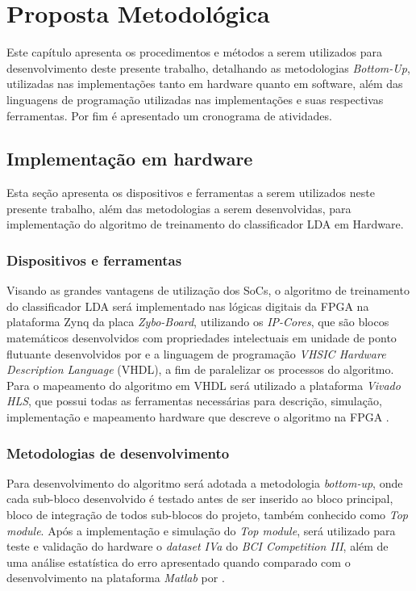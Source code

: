 \chapter[Proposta Metodológica]{Proposta Metodológica}
Este capítulo apresenta os procedimentos e métodos a serem utilizados para desenvolvimento deste presente
 trabalho, detalhando as metodologias \textit{Bottom-Up}, utilizadas nas implementações tanto em hardware
 quanto em software, além das linguagens de programação utilizadas nas implementações e suas respectivas
 ferramentas. Por fim é apresentado um cronograma de atividades.

\section{Implementação em hardware}
Esta seção apresenta os dispositivos e ferramentas a serem utilizados neste presente trabalho, além das metodologias a serem desenvolvidas, para implementação do algoritmo de treinamento do classificador LDA em Hardware.

\subsection{Dispositivos e ferramentas}
Visando as grandes vantagens de utilização dos SoCs, o algoritmo de treinamento do classificador
 LDA será implementado nas lógicas digitais da FPGA na plataforma Zynq da placa \textit{Zybo-Board}, utilizando
 os \textit{IP-Cores}, que são blocos matemáticos desenvolvidos com propriedades intelectuais \cite{munoz2010tradeoff} em unidade de ponto flutuante desenvolvidos por \cite{munoz2010tradeoff} e a linguagem de programação \textit{VHSIC Hardware Description Language} (VHDL), a fim de paralelizar os
 processos do algoritmo. Para o mapeamento do algoritmo em VHDL será utilizado a plataforma 
\textit{Vivado HLS}, que possui todas as ferramentas necessárias para descrição, simulação, implementação e mapeamento hardware que descreve o algoritmo na FPGA \cite{zynqBook}.

\subsection{Metodologias de desenvolvimento}
Para desenvolvimento do algoritmo será adotada a metodologia \textit{bottom-up}, onde cada sub-bloco desenvolvido é testado antes de ser inserido ao bloco principal, bloco de integração de todos sub-blocos do projeto, também conhecido como \textit{Top module}.
Após a implementação e simulação do \textit{Top module}, será utilizado para teste e validação do hardware
 o \textit{dataset IVa} do \textit{BCI Competition III}, além de uma análise estatística do erro apresentado
 quando comparado com o desenvolvimento na plataforma \textit{Matlab} por \cite{F.Lotte}.

